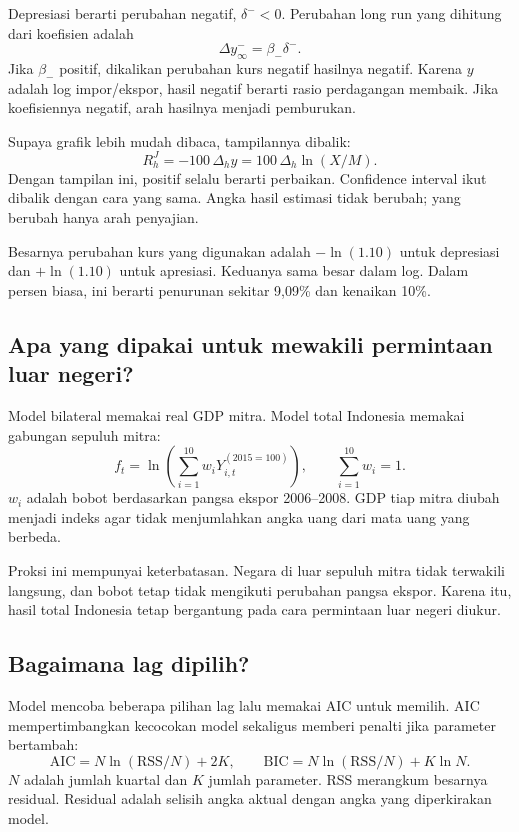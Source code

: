 Depresiasi berarti perubahan negatif, $\delta^-<0$. Perubahan long run yang dihitung dari koefisien adalah
\begin{equation}
 \Delta y_\infty^-=\beta_-\delta^-.
\end{equation}
Jika $\beta_-$ positif, dikalikan perubahan kurs negatif hasilnya negatif. Karena $y$ adalah log impor/ekspor, hasil negatif berarti rasio perdagangan membaik. Jika koefisiennya negatif, arah hasilnya menjadi pemburukan.

Supaya grafik lebih mudah dibaca, tampilannya dibalik:
\begin{equation}
 R_h^J=-100\,\Delta_h y=100\,\Delta_h\ln(X/M).\label{eq:display}
\end{equation}
Dengan tampilan ini, positif selalu berarti perbaikan. Confidence interval ikut dibalik dengan cara yang sama. Angka hasil estimasi tidak berubah; yang berubah hanya arah penyajian.

Besarnya perubahan kurs yang digunakan adalah $-\ln(1.10)$ untuk depresiasi dan $+\ln(1.10)$ untuk apresiasi. Keduanya sama besar dalam log. Dalam persen biasa, ini berarti penurunan sekitar 9,09\% dan kenaikan 10\%.

\subsection{Apa yang dipakai untuk mewakili permintaan luar negeri?}
Model bilateral memakai real GDP mitra. Model total Indonesia memakai gabungan sepuluh mitra:
\begin{equation}
 f_t=\ln\left(\sum_{i=1}^{10}w_iY^{(2015=100)}_{i,t}\right),
 \qquad \sum_{i=1}^{10}w_i=1.
\end{equation}
$w_i$ adalah bobot berdasarkan pangsa ekspor 2006--2008. GDP tiap mitra diubah menjadi indeks agar tidak menjumlahkan angka uang dari mata uang yang berbeda.

Proksi ini mempunyai keterbatasan. Negara di luar sepuluh mitra tidak terwakili langsung, dan bobot tetap tidak mengikuti perubahan pangsa ekspor. Karena itu, hasil total Indonesia tetap bergantung pada cara permintaan luar negeri diukur.

\subsection{Bagaimana lag dipilih?}
Model mencoba beberapa pilihan lag lalu memakai AIC untuk memilih. AIC mempertimbangkan kecocokan model sekaligus memberi penalti jika parameter bertambah:
\begin{equation}
 \mathrm{AIC}=N\ln(\mathrm{RSS}/N)+2K,\qquad
 \mathrm{BIC}=N\ln(\mathrm{RSS}/N)+K\ln N.
\end{equation}
$N$ adalah jumlah kuartal dan $K$ jumlah parameter. RSS merangkum besarnya residual. Residual adalah selisih angka aktual dengan angka yang diperkirakan model.

